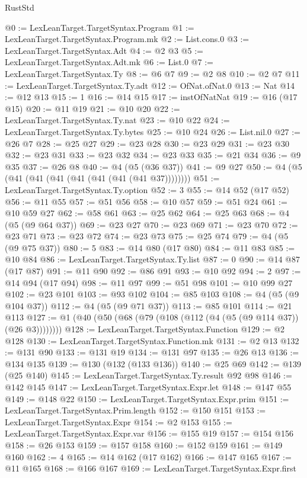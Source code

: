 \begin{lexlean}{RustStd}
\begin{coremodule}
@0 := LexLeanTarget.TargetSyntax.Program
@1 := LexLeanTarget.TargetSyntax.Program.mk
@2 := List.cons.{0}
@3 := LexLeanTarget.TargetSyntax.Adt
@4 := @2 @3
@5 := LexLeanTarget.TargetSyntax.Adt.mk
@6 := List.{0}
@7 := LexLeanTarget.TargetSyntax.Ty
@8 := @6 @7
@9 := @2 @8
@10 := @2 @7
@11 := LexLeanTarget.TargetSyntax.Ty.adt
@12 := OfNat.ofNat.{0}
@13 := Nat
@14 := @12 @13
@15 := 1
@16 := @14 @15
@17 := instOfNatNat
@19 := @16 (@17 @15)
@20 := @11 @19
@21 := @10 @20
@22 := LexLeanTarget.TargetSyntax.Ty.nat
@23 := @10 @22
@24 := LexLeanTarget.TargetSyntax.Ty.bytes
@25 := @10 @24
@26 := List.nil.{0}
@27 := @26 @7
@28 := @25 @27
@29 := @23 @28
@30 := @23 @29
@31 := @23 @30
@32 := @23 @31
@33 := @23 @32
@34 := @23 @33
@35 := @21 @34
@36 := @9 @35
@37 := @26 @8
@40 := @4 (@5 (@36 @37))
@41 := @9 @27
@50 := @4 (@5 (@41 (@41 (@41 (@41 (@41 (@41 (@41 @37))))))))
@51 := LexLeanTarget.TargetSyntax.Ty.option
@52 := 3
@55 := @14 @52 (@17 @52)
@56 := @11 @55
@57 := @51 @56
@58 := @10 @57
@59 := @51 @24
@61 := @10 @59 @27
@62 := @58 @61
@63 := @25 @62
@64 := @25 @63
@68 := @4 (@5 (@9 @64 @37))
@69 := @23 @27
@70 := @23 @69
@71 := @23 @70
@72 := @23 @71
@73 := @23 @72
@74 := @23 @73
@75 := @25 @74
@79 := @4 (@5 (@9 @75 @37))
@80 := 5
@83 := @14 @80 (@17 @80)
@84 := @11 @83
@85 := @10 @84
@86 := LexLeanTarget.TargetSyntax.Ty.list
@87 := 0
@90 := @14 @87 (@17 @87)
@91 := @11 @90
@92 := @86 @91
@93 := @10 @92
@94 := 2
@97 := @14 @94 (@17 @94)
@98 := @11 @97
@99 := @51 @98
@101 := @10 @99 @27
@102 := @23 @101
@103 := @93 @102
@104 := @85 @103
@108 := @4 (@5 (@9 @104 @37))
@112 := @4 (@5 (@9 @71 @37))
@113 := @85 @101
@114 := @21 @113
@127 := @1 (@40 (@50 (@68 (@79 (@108 (@112 (@4 (@5 (@9 @114 @37)) (@26 @3))))))))
@128 := LexLeanTarget.TargetSyntax.Function
@129 := @2 @128
@130 := LexLeanTarget.TargetSyntax.Function.mk
@131 := @2 @13
@132 := @131 @90
@133 := @131 @19
@134 := @131 @97
@135 := @26 @13
@136 := @134 @135
@139 := @130 (@132 (@133 @136))
@140 := @25 @69
@142 := @139 (@25 @140)
@145 := LexLeanTarget.TargetSyntax.Ty.result @92 @98
@146 := @142 @145
@147 := LexLeanTarget.TargetSyntax.Expr.let
@148 := @147 @55
@149 := @148 @22
@150 := LexLeanTarget.TargetSyntax.Expr.prim
@151 := LexLeanTarget.TargetSyntax.Prim.length
@152 := @150 @151
@153 := LexLeanTarget.TargetSyntax.Expr
@154 := @2 @153
@155 := LexLeanTarget.TargetSyntax.Expr.var
@156 := @155 @19
@157 := @154 @156
@158 := @26 @153
@159 := @157 @158
@160 := @152 @159
@161 := @149 @160
@162 := 4
@165 := @14 @162 (@17 @162)
@166 := @147 @165
@167 := @11 @165
@168 := @166 @167
@169 := LexLeanTarget.TargetSyntax.Expr.first

\end{coremodule}
\end{lexlean}
